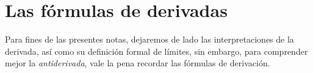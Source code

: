 \section{Las fórmulas de derivadas}

Para fines de las presentes notas, dejaremos de lado las interpretaciones de la derivada, así como su definición formal de límites, sin embargo, para comprender mejor la \textsl{antiderivada}, vale la pena recordar las fórmulas de derivación.


